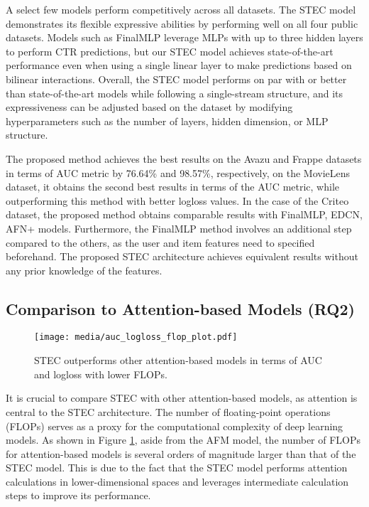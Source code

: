 \documentclass{article}
\begin{document}
A select few models perform competitively across all datasets. The STEC model demonstrates its flexible expressive abilities by performing well on all four public datasets. Models such as FinalMLP leverage MLPs with up to three hidden layers to perform CTR predictions, but our STEC model achieves state-of-the-art performance even when using a single linear layer to make predictions based on bilinear interactions. Overall, the STEC model performs on par with or better than state-of-the-art models while following a single-stream structure, and its expressiveness can be adjusted based on the dataset by modifying hyperparameters such as the number of layers, hidden dimension, or MLP structure.

The proposed method achieves the best results on the Avazu and Frappe datasets in terms of AUC metric by 76.64\% and 98.57\%, respectively, on the MovieLens dataset, it obtains the second best results in terms of the AUC metric, while outperforming this method with better logloss values. In the case of the Criteo dataset, the proposed method obtains comparable results with FinalMLP, EDCN, AFN+ models. Furthermore, the FinalMLP method involves an additional step compared to the others, as the user and item features need to specified beforehand. The proposed STEC architecture achieves equivalent results without any prior knowledge of the features.

\subsection{Comparison to Attention-based Models (RQ2)}

\begin{figure}[t]
\centering
\texttt{[image: media/auc\_logloss\_flop\_plot.pdf]}
\caption{STEC outperforms other attention-based models in terms of AUC and logloss with lower FLOPs.}
\label{fig:auc_logloss_flop_plot}
\end{figure}

It is crucial to compare STEC with other attention-based models, as attention is central to the STEC architecture. The number of floating-point operations (FLOPs) serves as a proxy for the computational complexity of deep learning models. As shown in Figure \ref{fig:auc_logloss_flop_plot}, aside from the AFM model, the number of FLOPs for attention-based models is several orders of magnitude larger than that of the STEC model. This is due to the fact that the STEC model performs attention calculations in lower-dimensional spaces and leverages intermediate calculation steps to improve its performance.
\end{document}
